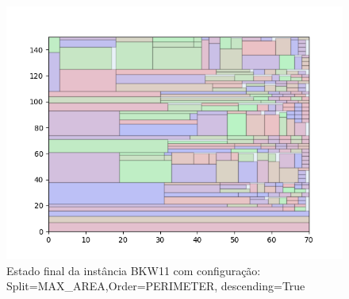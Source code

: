 \begin{figure}[H]
    \centering
    \caption[]{Estado final da instância BKW11 com configuração: Split=MAX_AREA,Order=PERIMETER, descending=True}
    \label{fig:bkw11-max_area-perimeter-true}
    \includegraphics[scale=0.5]{output/figures/bkw/bkw11/max_area/perimeter/true/000}
\end{figure}